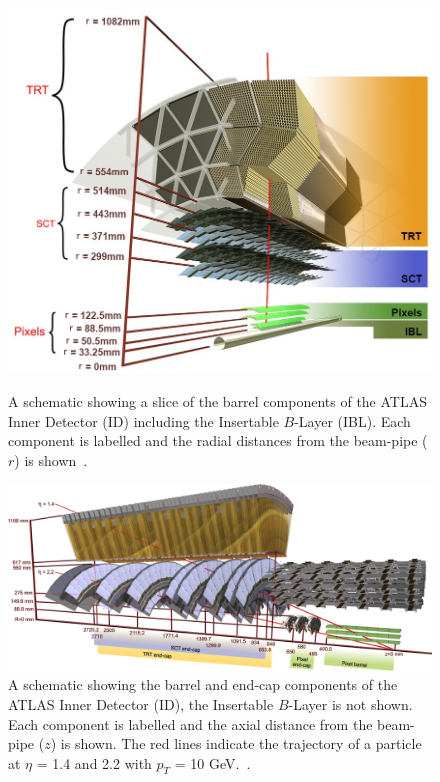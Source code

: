 \begin{figure}[!b]
  \begin{center}
    \includegraphics[width=0.7\linewidth, angle=0]{figs/Detector/ID_slice.png}
  \end{center}
  \caption[A schematic showing a slice of the barrel components of the ATLAS Inner Detector including the Insertable $B$-Layer.]
          {A schematic showing a slice of the barrel components of the ATLAS Inner Detector (ID) including the Insertable $B$-Layer (IBL).
            Each component is labelled and the radial distances from the beam-pipe ($r$) is shown~\cite{obj-tracks_TIDE}.}
  \label{fig:det-ID_slice}

  \begin{center}
    \includegraphics[width=0.9\linewidth, angle=0]{figs/Detector/ID_schem.pdf}
  \end{center}
  \caption[A schematic showing the barrel and end-cap components of the ATLAS Inner Detector.]
          {A schematic showing the barrel and end-cap components of the ATLAS Inner Detector (ID), the Insertable $B$-Layer is not shown.
            Each component  is labelled and the axial distance from the beam-pipe ($z$) is shown.
            The red lines indicate the trajectory of a particle at $\eta$ = 1.4 and 2.2 with $p_T$ = 10 GeV.~\cite{det-ATLAS_Exp}.}
  \label{fig:det-ID_schem}
\end{figure}



